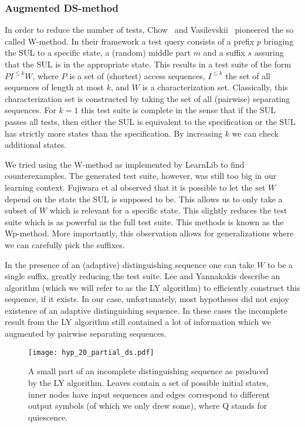 \subsubsection{Augmented DS-method}
\label{sec:randomPrefix}

In order to reduce the number of tests, Chow~\cite{Ch78} and
Vasilevskii~\cite{vasilevskii1973failure} pioneered the so called W-method. In
their framework a test query consists of a prefix $p$ bringing the SUL to a
specific state, a (random) middle part $m$ and a suffix $s$ assuring that the
SUL is in the appropriate state. This results in a test suite of the form $P
I^{\leq k} W$, where $P$ is a set of (shortest) access sequences, $I^{\leq k}$
the set of all sequences of length at most $k$, and $W$ is a characterization
set. Classically, this characterization set is constructed by taking the set of
all (pairwise) separating sequences. For $k=1$ this test suite is complete in
the sense that if the SUL passes all tests, then either the SUL is equivalent to
the specification or the SUL has strictly more states than the specification. By
increasing $k$ we can check additional states.

We tried using the W-method as implemented by LearnLib to find counterexamples.
The generated test suite, however, was still too big in our learning context.
Fujiwara et al \cite{FBKAG91} observed that it is possible to let the set $W$ depend on the state the
SUL is supposed to be. This allows us to only take a subset of $W$ which
is relevant for a specific state. This slightly reduces the test suite which is
as powerful as the full test suite. This methods is known as the Wp-method. More
importantly, this observation allows for generalizations where we can carefully
pick the suffixes.

In the presence of an (adaptive) distinguishing sequence one can take $W$ to be a
single suffix, greatly reducing the test suite. Lee and Yannakakis \cite{LYa94} describe an
algorithm (which we will refer to as the LY algorithm) to efficiently
construct this sequence, if it exists. In our case, unfortunately, most
hypotheses did not enjoy existence of an adaptive distinguishing sequence. In
these cases the incomplete result from the LY algorithm still contained a lot of
information which we augmented by pairwise separating sequences.

\begin{figure}
  \centering \texttt{[image: hyp\_20\_partial\_ds.pdf]}
  \caption{A small part of an incomplete distinguishing sequence as produced by
  the LY algorithm. Leaves contain a set of possible initial states, inner nodes
  have input sequences and edges correspond to different output symbols (of
  which we only drew some), where Q stands for quiescence.}
  \label{fig:distinguishing-sequence}
\end{figure}

